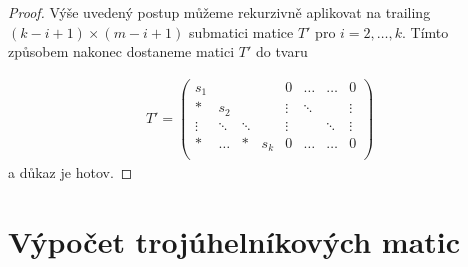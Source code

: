 \begin{proof}
Výše uvedený postup můžeme rekurzivně aplikovat na trailing
$ (k - i + 1) \times (m - i + 1) $ submatici matice $ T' $ pro $ i = 2,\dots, k$.
Tímto způsobem nakonec dostaneme matici $ T' $ do tvaru

\begin{align} \label{extra_cols_reduced}
T' =
    \left(
    \begin{array}{cccc|cccc}
        s_1    &        &        &     & 0       & \hdots & \hdots & 0      \\
        \ast   & s_2    &        &     & \vdots  & \ddots &        & \vdots \\
        \vdots & \ddots & \ddots &     & \vdots  &        & \ddots & \vdots \\
        \ast   & \hdots & \ast   & s_k & 0       & \hdots & \hdots & 0      \\
    \end{array}
    \right)
\end{align}
a důkaz je hotov.
\end{proof}



\section{Výpočet \snf{} trojúhelníkových matic}

